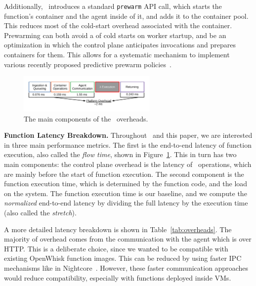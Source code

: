 Additionally, \sysname~introduces a standard \texttt{prewarm}  API call, which starts the function's container and the agent inside of it, and adds it to the container pool.
This reduces most of the cold-start overhead associated with the container.
Prewarming can both avoid a  of cold starts on worker startup, and be an optimization in which the control plane anticipates invocations and prepares containers for them. 
This allows for a systematic mechanism to implement various recently proposed predictive prewarm policies~\cite{roy2022icebreaker, shahrad_serverless_2020, silva_prebaking_2020}. 





\begin{figure}
\centering 
\includegraphics[width=0.6\textwidth]{iluvatar/figs/OverheadTimeline.pdf}
\caption{The main components of the \sysname~overheads.}
\label{fig:timeline-flow}
\end{figure}


\noindent \textbf{Function Latency Breakdown.}
Throughout \sysname~and this paper, we are interested in three main performance metrics. 
The first is the end-to-end latency of function execution, also called the \emph{flow time}, shown in Figure~\ref{fig:timeline-flow}.
This in turn has two main components: the control plane overhead is the latency of \sysname~operations, which are mainly before the start of function execution.
The second component is the function execution time, which is determined by the function code, and the load on the system.
The function execution time is our baseline, and we compute the \emph{normalized} end-to-end latency by dividing the full latency by the execution time (also called the \emph{stretch}). 

A more detailed latency breakdown is shown in Table~\ref{tab:overheads}.
The majority of overhead comes from the communication with the agent which is over HTTP. 
This is a deliberate choice, since we wanted to be compatible with existing OpenWhisk function images.
This can be reduced by using faster IPC mechanisms like in Nightcore~\cite{jia2021nightcore}. 
However, these faster communication approaches would reduce compatibility, especially with functions deployed inside VMs.

